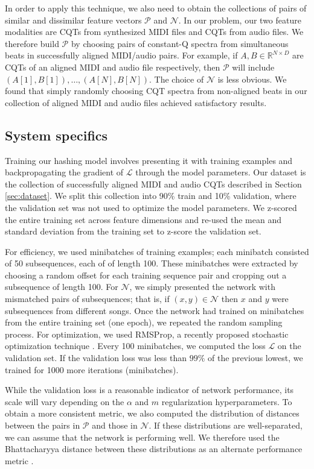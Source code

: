 \documentclass{article}
\begin{document}
In order to apply this technique, we also need to obtain the collections of pairs of similar and dissimilar feature vectors $\mathcal{P}$ and $\mathcal{N}$.
In our problem, our two feature modalities are CQTs from synthesized MIDI files and CQTs from audio files.
We therefore build $\mathcal{P}$ by choosing pairs of constant-Q spectra from simultaneous beats in successfully aligned MIDI/audio pairs.
For example, if $A, B \in \mathbb{R}^{N \times D}$ are CQTs of an aligned MIDI and audio file respectively, then $\mathcal{P}$ will include $(A[1], B[1]), \ldots, (A[N], B[N])$.
The choice of $\mathcal{N}$ is less obvious.
We found that simply randomly choosing CQT spectra from non-aligned beats in our collection of aligned MIDI and audio files achieved satisfactory results.

\subsection{System specifics}

Training our hashing model involves presenting it with training examples and backpropagating the gradient of $\mathcal{L}$ through the model parameters.
Our dataset is the collection of successfully aligned MIDI and audio CQTs described in Section \ref{sec:dataset}.
We split this collection into 90\% train and 10\% validation, where the validation set was not used to optimize the model parameters.
We z-scored the entire training set across feature dimensions and re-used the mean and standard deviation from the training set to z-score the validation set.

For efficiency, we used minibatches of training examples; each minibatch consisted of 50 subsequences, each of of length 100.
These minibatches were extracted by choosing a random offset for each training sequence pair and cropping out a subsequence of length 100.
For $\mathcal{N}$, we simply presented the network with mismatched pairs of subsequences; that is, if $(x, y) \in \mathcal{N}$ then $x$ and $y$ were subsequences from different songs.
Once the network had trained on minibatches from the entire training set (one epoch), we repeated the random sampling process. 
For optimization, we used RMSProp, a recently proposed stochastic optimization technique \cite{tieleman2012lecture}.
Every 100 minibatches, we computed the loss $\mathcal{L}$ on the validation set.
If the validation loss was less than $99\%$ of the previous lowest, we trained for 1000 more iterations (minibatches).

While the validation loss is a reasonable indicator of network performance, its scale will vary depending on the $\alpha$ and $m$ regularization hyperparameters.
To obtain a more consistent metric, we also computed the distribution of distances between the pairs in $\mathcal{P}$ and those in $\mathcal{N}$.
If these distributions are well-separated, we can assume that the network is performing well.
We therefore used the Bhattacharyya distance between these distributions as an alternate performance metric \cite{bhattacharyya1943measure}.
\end{document}
